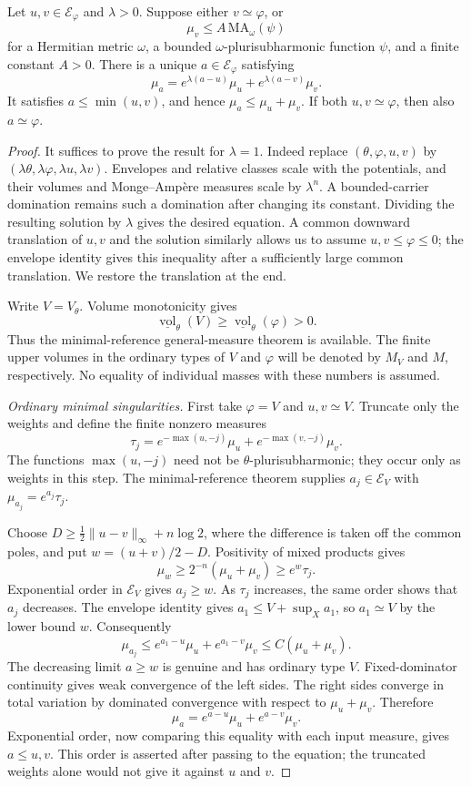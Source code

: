 \begin{theorem}\label{thm:big-weighted-addition}
Let $u,v\in\mathcal E_\varphi$ and $\lambda>0$. Suppose either $v\simeq\varphi$, or
\[
 \mu_v\leq A\,\mathrm{MA}_\omega(\psi)
\]
for a Hermitian metric $\omega$, a bounded $\omega$-plurisubharmonic function $\psi$, and a finite constant $A>0$. There is a unique $a\in\mathcal E_\varphi$ satisfying
\[
 \mu_a=e^{\lambda(a-u)}\mu_u+e^{\lambda(a-v)}\mu_v.
\]
It satisfies $a\leq\min(u,v)$, and hence $\mu_a\leq\mu_u+\mu_v$. If both $u,v\simeq\varphi$, then also $a\simeq\varphi$.
\end{theorem}
\begin{proof}
It suffices to prove the result for $\lambda=1$. Indeed replace $(\theta,\varphi,u,v)$ by $(\lambda\theta,\lambda\varphi,\lambda u,\lambda v)$. Envelopes and relative classes scale with the potentials, and their volumes and Monge--Amp\`ere measures scale by $\lambda^n$. A bounded-carrier domination remains such a domination after changing its constant. Dividing the resulting solution by $\lambda$ gives the desired equation. A common downward translation of $u,v$ and the solution similarly allows us to assume $u,v\leq\varphi\leq0$; the envelope identity gives this inequality after a sufficiently large common translation. We restore the translation at the end.

Write $V=V_\theta$. Volume monotonicity gives
\[
 \underline{\operatorname{vol}}_\theta(V)
 \geq\underline{\operatorname{vol}}_\theta(\varphi)>0.
\]
Thus the minimal-reference general-measure theorem is available. The finite upper volumes in the ordinary types of $V$ and $\varphi$ will be denoted by $M_V$ and $M$, respectively. No equality of individual masses with these numbers is assumed.

\emph{Ordinary minimal singularities.}
First take $\varphi=V$ and $u,v\simeq V$. Truncate only the weights and define the finite nonzero measures
\[
 \tau_j=e^{-\max(u,-j)}\mu_u+e^{-\max(v,-j)}\mu_v.
\]
The functions $\max(u,-j)$ need not be $\theta$-plurisubharmonic; they occur only as weights in this step. The minimal-reference theorem supplies $a_j\in\mathcal E_V$ with $\mu_{a_j}=e^{a_j}\tau_j$.

Choose $D\geq\tfrac12\|u-v\|_\infty+n\log2$, where the difference is taken off the common poles, and put $w=(u+v)/2-D$. Positivity of mixed products gives
\[
 \mu_w\geq2^{-n}(\mu_u+\mu_v)\geq e^w\tau_j.
\]
Exponential order in $\mathcal E_V$ gives $a_j\geq w$. As $\tau_j$ increases, the same order shows that $a_j$ decreases. The envelope identity gives $a_1\leq V+\sup_Xa_1$, so $a_1\simeq V$ by the lower bound $w$. Consequently
\[
 \mu_{a_j}
 \leq e^{a_1-u}\mu_u+e^{a_1-v}\mu_v
 \leq C(\mu_u+\mu_v).
\]
The decreasing limit $a\geq w$ is genuine and has ordinary type $V$. Fixed-dominator continuity gives weak convergence of the left sides. The right sides converge in total variation by dominated convergence with respect to $\mu_u+\mu_v$. Therefore
\[
 \mu_a=e^{a-u}\mu_u+e^{a-v}\mu_v.
\]
Exponential order, now comparing this equality with each input measure, gives $a\leq u,v$. This order is asserted after passing to the equation; the truncated weights alone would not give it against $u$ and $v$.


\end{proof}
